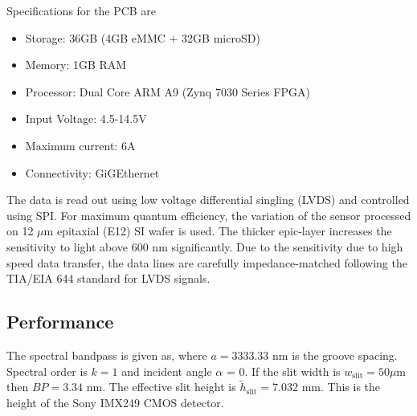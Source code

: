 Specifications for the PCB are
\begin{itemize}
\item Storage: 36GB (4GB eMMC + 32GB microSD)
\item Memory: 1GB RAM
\item Processor: Dual Core ARM A9 (Zynq 7030 Series FPGA)
\item Input Voltage: 4.5-14.5V
\item Maximum current: 6A 
\item Connectivity: GiGEthernet
\end{itemize}

The data is read out using low voltage differential singling (LVDS) and controlled using SPI. For maximum quantum efficiency, the variation of the sensor processed on 12 $\mu$m epitaxial (E12) SI wafer is used. The thicker epic-layer increases the sensitivity to light above 600 nm significantly. Due to the sensitivity due to high speed data transfer, the data lines are carefully impedance-matched following the TIA/EIA 644 standard for LVDS signals.

\subsection{Performance}
The spectral bandpass is given as, where $a = 3333.33$ nm is the groove spacing. Spectral order is $k=1$ and incident angle $\alpha$ = 0. If the slit width is $w_{\text{slit}} = 50 \mu$m then $BP= 3.34$ nm. The effective slit height is $\tilde{h}_{\text{slit}}=7.032$ mm. This is the height of the Sony IMX249 CMOS detector.


